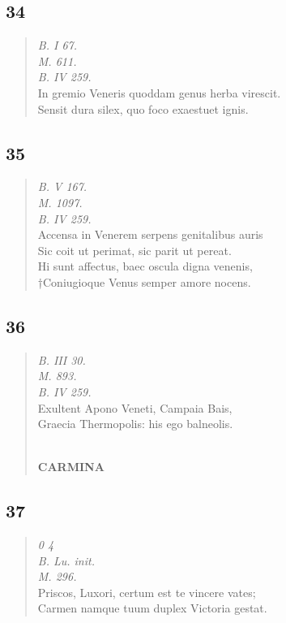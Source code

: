 \documentclass[11pt, a4paper]{report}
\begin{document}
            \subsection*{34}
      \begin{verse}
      \textit{B. I 67.} \\ \textit{M. 611.} \\ \textit{B. IV 259.} \\ In gremio Veneris quoddam genus herba virescit. \\ Sensit dura silex, quo foco exaestuet ignis. \\ 
      \end{verse}
  
            \subsection*{35}
      \begin{verse}
      \textit{B. V 167.} \\ \textit{M. 1097.} \\ \textit{B. IV 259.} \\ Accensa in Venerem serpens genitalibus auris \\ Sic coit ut perimat, sic parit ut pereat. \\ Hi sunt affectus, baec oscula digna venenis, \\ †Coniugioque Venus semper amore nocens. \\ 
      \end{verse}
  
            \subsection*{36}
      \begin{verse}
      \textit{B. III 30.} \\ \textit{M. 893.} \\ \textit{B. IV 259.} \\ Exultent Apono Veneti, Campaia Bais, \\ Graecia Thermopolis: his ego balneolis. \\ 
        ﻿\pagebreak 
     \marginpar{[102]} \begin{center} \textbf{CARMINA} \end{center}
      \end{verse}
  
            \subsection*{37}
      \begin{verse}
      \textit{0 4} \\ \textit{B. Lu. init.} \\ \textit{M. 296.} \\ Priscos, Luxori, certum est te vincere vates; \\ Carmen namque tuum duplex Victoria gestat. \\ 
      \end{verse}
  
\end{document}
